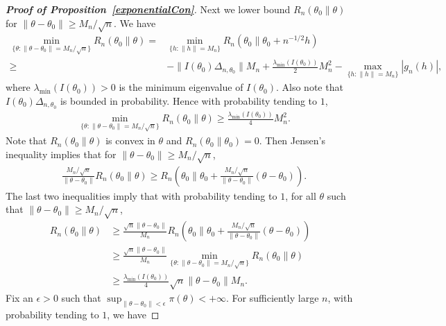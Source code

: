 \documentclass[11pt]{article}
\theoremstyle{plain}
\theoremstyle{definition}
\theoremstyle{remark}
\begin{document}
\begin{appendices}
\begin{proof}[\textbf{Proof of Proposition~\ref{exponentialCon}}]
Next we lower bound $
    R_n ( \theta_0 \| \theta  )
$ for $\|\theta-\theta_0\|\geq M_n/\sqrt{n}$.
    We have
    $$
    \begin{aligned}
        \min_{\{\theta:\|\theta-\theta_0\|=M_n/\sqrt{n}\}}
    R_n ( \theta_0 \| \theta  )
    =&
    \min_{\{h:\|h\|=M_n\}}
    R_n ( \theta_0 \| \theta_0+n^{-1/2}h )
        \\
        \geq &
        -\|I(\theta_0)\Delta_{n,\theta_0}\| M_n +\frac{\lambda_{\min}(I(\theta_0))}{2} M_n^2 -
        \max_{\{h:\|h\|=M_n\}}|g_n(h)|,
    \end{aligned}
    $$
    where $\lambda_{\min}( I(\theta_0) )>0$ is the minimum eigenvalue of $I(\theta_0)$.
    Also note that $I(\theta_0) \Delta_{n,\theta_0}$ is bounded in probability.
    Hence with probability tending to $1$,
    $$
    \begin{aligned}
        &\min_{\{\theta:\|\theta-\theta_0\|=M_n/\sqrt{n}\}}
        R_n ( \theta_0 \| \theta  )
        \geq 
        \frac{\lambda_{\min}(I(\theta_0))}{4}M_n^2.
    \end{aligned} 
    $$
    Note that $R_n(\theta_0 \| \theta)$ is convex in $\theta$ and $R_n (\theta_0 \| \theta_0) = 0 $.
    Then Jensen's inequality implies that for $\|\theta-\theta_0\|\geq M_n/\sqrt{n}$,
    \begin{equation*}
        \begin{split}
     &\frac{M_n/\sqrt{n}}{\|\theta-\theta_0\|}
     R_n(\theta_0 \| \theta)
     \geq
     R_n\left( \theta_0 \Big\| \theta_0+ \frac{M_n/\sqrt{n}}{\|\theta-\theta_0\|}(\theta-\theta_0)\right)
     .
        \end{split}
    \end{equation*}
    The last two inequalities imply that with probability tending to $1$, for all $\theta$ such that $\|\theta- \theta_0\|\geq M_n / \sqrt n$,
    $$
    \begin{aligned}
        R_n(\theta_0 \| \theta)
        &\geq
        \frac{\sqrt{n}\|\theta-\theta_0\|}{M_n}
      R_n\left(\theta_0\Big\|\theta_0+\frac{M_n/\sqrt{n}}{\|\theta-\theta_0\|}(\theta-\theta_0)\right)
        \\
        &\geq
        \frac{\sqrt{n}\|\theta-\theta_0\|}{M_n}
        \min_{\{\theta:\|\theta-\theta_0\|=M_n/\sqrt{n}\}}
        R_n ( \theta_0 \| \theta  )
        \\
        &\geq
        \frac{\lambda_{\min}(I(\theta_0))}{4}\sqrt{n}\|\theta-\theta_0\|
        M_n.
    \end{aligned}
    $$
    Fix an $\epsilon>0$ such that $\sup_{\|\theta-\theta_0\|< \epsilon}\pi(\theta) < +\infty $. For sufficiently large $n$, with probability tending to $1$, we have

\end{proof}
\end{appendices}
\end{document}
